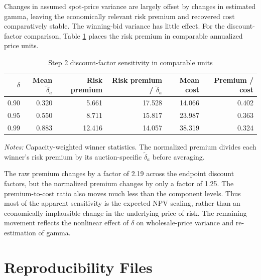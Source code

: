 \documentclass[10pt]{article}
\begin{document}
Changes in assumed spot-price variance are largely offset by changes in
estimated gamma, leaving the economically relevant risk premium and recovered
cost comparatively stable. The winning-bid variance has little effect. For the
discount-factor comparison, Table \ref{tab:step2_delta_scaling} places the risk
premium in comparable annualized price units.

\begin{table}[H]
\centering
\small
\caption{Step 2 discount-factor sensitivity in comparable units}
\label{tab:step2_delta_scaling}
\begin{tabular}{rrrrrr}
\toprule
$\delta$ & Mean $\widetilde\delta_a$ & Risk premium
& Risk premium / $\widetilde\delta_a$ & Mean cost & Premium / cost\\
\midrule
0.90 & 0.320 & 5.661 & 17.528 & 14.066 & 0.402\\
0.95 & 0.550 & 8.711 & 15.817 & 23.987 & 0.363\\
0.99 & 0.883 & 12.416 & 14.057 & 38.319 & 0.324\\
\bottomrule
\end{tabular}
\begin{minipage}{0.92\textwidth}
\footnotesize
\textit{Notes:} Capacity-weighted winner statistics. The normalized premium
divides each winner's risk premium by its auction-specific
$\widetilde\delta_a$ before averaging.
\end{minipage}
\end{table}

The raw premium changes by a factor of 2.19 across the endpoint discount
factors, but the normalized premium changes by only a factor of 1.25. The
premium-to-cost ratio also moves much less than the component levels. Thus most
of the apparent sensitivity is the expected NPV scaling, rather than an
economically implausible change in the underlying price of risk. The remaining
movement reflects the nonlinear effect of $\delta$ on wholesale-price variance
and re-estimation of gamma.

\section{Reproducibility Files}
\end{document}
